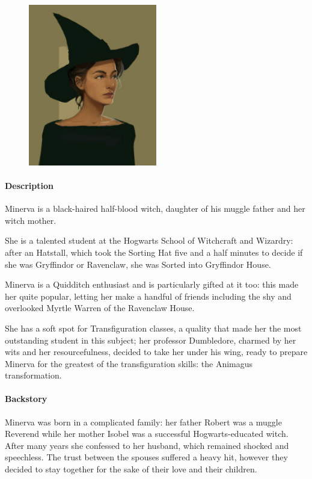 \begin{figure}
\centering
\includegraphics[max width=0.5\textwidth]{../Pictures/Characters/Portraits/Minerva_portrait.png}
\end{figure}

\paragraph{Description}
Minerva is a black-haired half-blood witch, daughter of his muggle father and her witch mother.

She is a talented student at the Hogwarts School of Witchcraft and Wizardry: after an Hatstall, which took the Sorting Hat five and a half minutes to decide if she was Gryffindor or Ravenclaw, she was Sorted into Gryffindor House. 

Minerva is a Quidditch enthusiast and is particularly gifted at it too: this made her quite popular, letting her make a handful of friends including the shy and overlooked Myrtle Warren of the Ravenclaw House.

She has a soft spot for Transfiguration classes, a quality that made her the most outstanding student in this subject; her professor Dumbledore, charmed by her wits and her resourcefulness, decided to take her under his wing, ready to prepare Minerva for the greatest of the transfiguration skills: the Animagus transformation.

\paragraph{Backstory}
Minerva was born in a complicated family: her father Robert was a muggle Reverend while her mother Isobel was a successful Hogwarts-educated witch. After many years she confessed to her husband, which remained shocked and speechless. The trust between the spouses suffered a heavy hit, however they decided to stay together for the sake of their love and their children.

